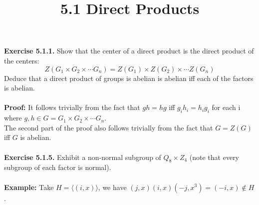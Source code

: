 \documentclass{article}
\title{\textbf{5.1 Direct Products}}
\begin{document}
	\maketitle
	\textbf{Exercise 5.1.1.} Show that the center of a direct product is the direct product of the centers:
	$$Z(G_1 \times G_2 \times \cdots G_n) = Z(G_1) \times Z(G_2) \times \cdots Z(G_n)$$
	Deduce that a direct product of groups is abelian is abelian iff each of the factors is abelian. \\ \\
	\textbf{Proof:} It follows trivially from the fact that $gh = hg$ iff $g_ih_i = h_ig_i$ for each i where $g, h \in G = G_1 \times G_2 \times \cdots G_n$. \\
	The second part of the proof also follows trivially from the fact that $G = Z(G)$ iff $G$ is abelian. \\ \\
	\textbf{Exercise 5.1.5.} Exhibit a non-normal subgroup of $Q_8 \times Z_4$ (note that every subgroup of each factor is normal). \\ \\
	\textbf{Example:} Take $H = \langle(i, x)\rangle$, we have $(j, x)(i, x)(-j, x^3) = (-i, x) \not \in H$.
\end{document}
